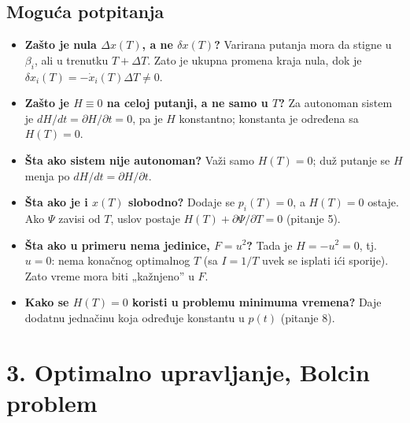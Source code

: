 \documentclass[11pt,a4paper,parskip=half,headsepline,numbers=noenddot]{scrartcl}
\begin{document}
\subsection{Moguća potpitanja}

\begin{itemize}
\item \textbf{Zašto je nula \(\Delta x(T)\), a ne \(\delta x(T)\)?} Varirana putanja mora da stigne u \(\beta_i\), ali u trenutku \(T + \Delta T\). Zato je ukupna promena kraja nula, dok je \(\delta x_i(T) = -\dot x_i(T)\Delta T \ne 0\).
\item \textbf{Zašto je \(H \equiv 0\) na celoj putanji, a ne samo u \(T\)?} Za autonoman sistem je \(dH/dt = \partial H/\partial t = 0\), pa je \(H\) konstantno; konstanta je određena sa \(H(T) = 0\).
\item \textbf{Šta ako sistem nije autonoman?} Važi samo \(H(T) = 0\); duž putanje se \(H\) menja po \(dH/dt = \partial H/\partial t\).
\item \textbf{Šta ako je i \(x(T)\) slobodno?} Dodaje se \(p_i(T) = 0\), a \(H(T) = 0\) ostaje. Ako \(\Psi\) zavisi od \(T\), uslov postaje \(H(T) + \partial\Psi/\partial T = 0\) (pitanje 5).
\item \textbf{Šta ako u primeru nema jedinice, \(F = u^2\)?} Tada je \(H = -u^2 = 0\), tj. \(u = 0\): nema konačnog optimalnog \(T\) (sa \(I = 1/T\) uvek se isplati ići sporije). Zato vreme mora biti „kažnjeno'' u \(F\).
\item \textbf{Kako se \(H(T) = 0\) koristi u problemu minimuma vremena?} Daje dodatnu jednačinu koja određuje konstantu u \(p(t)\) (pitanje 8).
\end{itemize}

\section{3. Optimalno upravljanje, Bolcin problem}
\end{document}
